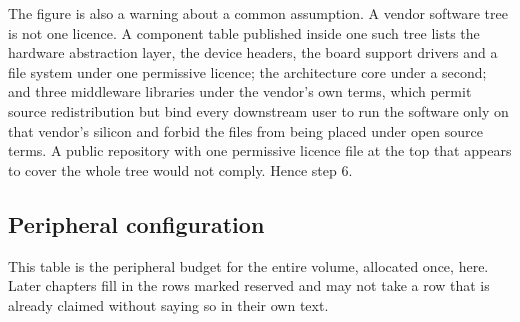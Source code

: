 
The figure is also a warning about a common assumption. A vendor software tree
is not one licence. A component table published inside one such tree lists the
hardware abstraction layer, the device headers, the board support drivers and a
file system under one permissive licence; the architecture core under a second;
and three middleware libraries under the vendor's own terms, which permit source
redistribution but bind every downstream user to run the software only on that
vendor's silicon and forbid the files from being placed under open source terms.
A public repository with one permissive licence file at the top that appears to
cover the whole tree would not comply. Hence step 6.

\subsection*{Peripheral configuration}

This table is the peripheral budget for the entire volume, allocated once, here.
Later chapters fill in the rows marked reserved and may not take a row that is
already claimed without saying so in their own text.

